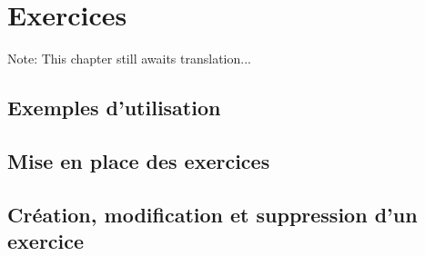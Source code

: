 
\chapter{Exercices\label{financialyear}}

Note: This chapter still awaits translation...

\section{Exemples d'utilisation}


\section{Mise en place des exercices\label{financialyear-start}}


\section{Création, modification et suppression d'un exercice}






